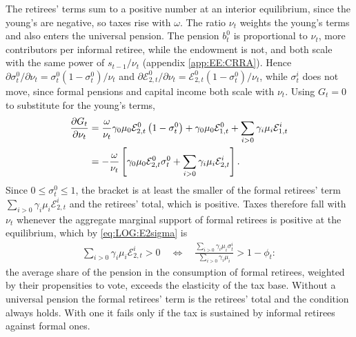  The retirees' terms sum to a positive number at an interior equilibrium, since the young's are negative, so taxes rise with $\omega$. The ratio $\nu_t$ weights the young's terms and also enters the universal pension. The pension $b_t^0$ is proportional to $\nu_t$, more contributors per informal retiree, while the endowment is not, and both scale with the same power of $s_{t-1}/\nu_t$ (appendix \ref{app:EE:CRRA}). Hence $\partial\sigma_t^0/\partial\nu_t = \sigma_t^0(1-\sigma_t^0)/\nu_t$ and $\partial\mathcal{E}_{2,t}^0/\partial\nu_t = \mathcal{E}_{2,t}^0(1-\sigma_t^0)/\nu_t$, while $\sigma_t^i$ does not move, since formal pensions and capital income both scale with $\nu_t$. Using $G_t = 0$ to substitute for the young's terms,
\begin{align}
    \frac{\partial G_t}{\partial\nu_t} &= \frac{\omega}{\nu_t}\gamma_0\mu_0\mathcal{E}_{2,t}^0\left(1-\sigma_t^0\right)+\gamma_0\mu_0\mathcal{E}_{1,t}^0+\sum_{i>0}\gamma_i\mu_i\mathcal{E}_{1,t}^i \notag\\
    &= -\frac{\omega}{\nu_t}\left[\gamma_0\mu_0\mathcal{E}_{2,t}^0\sigma_t^0+\sum_{i>0}\gamma_i\mu_i\mathcal{E}_{2,t}^i\right]. \label{eq:LOG:nuEffect}
\end{align}
Since $0 \leq \sigma_t^0 \leq 1$, the bracket is at least the smaller of the formal retirees' term $\sum_{i>0}\gamma_i\mu_i\mathcal{E}_{2,t}^i$ and the retirees' total, which is positive. Taxes therefore fall with $\nu_t$ whenever the aggregate marginal support of formal retirees is positive at the equilibrium, which by \eqref{eq:LOG:E2sigma} is
\begin{align}\label{eq:LOG:nuCondition}
    \sum_{i>0}\gamma_i\mu_i\mathcal{E}_{2,t}^i > 0 \quad\Longleftrightarrow\quad \frac{\sum_{i>0}\gamma_i\mu_i\sigma_t^i}{\sum_{i>0}\gamma_i\mu_i} > 1-\phi_t:
\end{align}
the average share of the pension in the consumption of formal retirees, weighted by their propensities to vote, exceeds the elasticity of the tax base. Without a universal pension the formal retirees' term is the retirees' total and the condition always holds. With one it fails only if the tax is sustained by informal retirees against formal ones.


